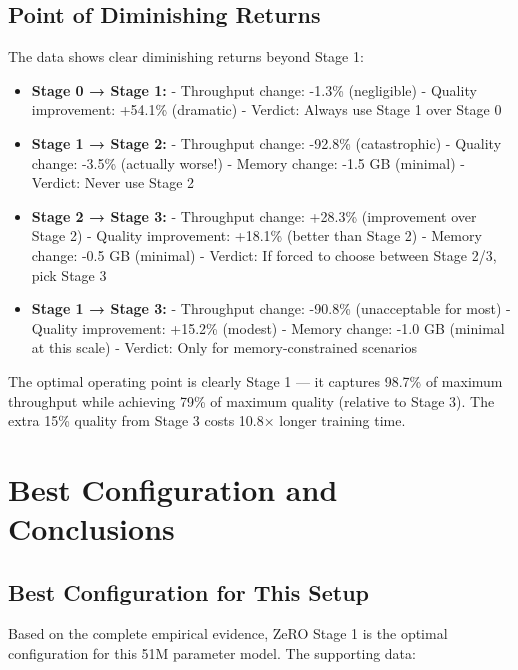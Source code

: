 
\subsection{Point of Diminishing Returns}

The data shows clear diminishing returns beyond Stage 1:

\begin{itemize}[leftmargin=1.5em, itemsep=4pt]
  \item \textbf{Stage 0 → Stage 1:} 
    - Throughput change: -1.3\% (negligible)
    - Quality improvement: +54.1\% (dramatic)
    - Verdict:  Always use Stage 1 over Stage 0 
  
  \item \textbf{Stage 1 → Stage 2:} 
    - Throughput change: -92.8\% (catastrophic)
    - Quality change: -3.5\% (actually worse!)
    - Memory change: -1.5 GB (minimal)
    - Verdict:  Never use Stage 2 
  
  \item \textbf{Stage 2 → Stage 3:} 
    - Throughput change: +28.3\% (improvement over Stage 2)
    - Quality improvement: +18.1\% (better than Stage 2)
    - Memory change: -0.5 GB (minimal)
    - Verdict:  If forced to choose between Stage 2/3, pick Stage 3 
  
  \item \textbf{Stage 1 → Stage 3:} 
    - Throughput change: -90.8\% (unacceptable for most)
    - Quality improvement: +15.2\% (modest)
    - Memory change: -1.0 GB (minimal at this scale)
    - Verdict:  Only for memory-constrained scenarios 
\end{itemize}

 The optimal operating point is clearly Stage 1  — it captures 98.7\% of maximum throughput while achieving 79\% of maximum quality (relative to Stage 3). The extra 15\% quality from Stage 3 costs 10.8× longer training time.


\section{Best Configuration and Conclusions}

\subsection{Best Configuration for This Setup}

Based on the complete empirical evidence,  ZeRO Stage 1 is the optimal configuration  for this 51M parameter model. The supporting data:

